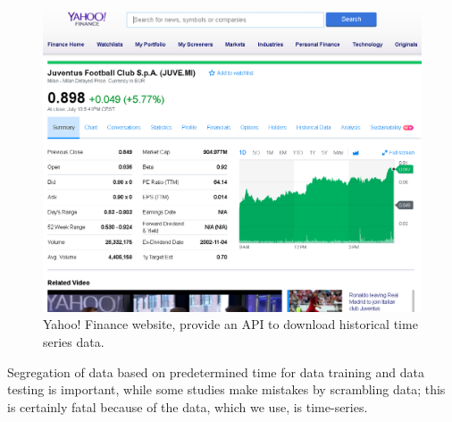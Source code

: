 \documentclass[10pt,twocolumn]{article}
\begin{document}
\begin{table}[]
\caption{The period time of our dataset, separated between the training, testing and independent data.}
\label{Tab:datasettime}
\end{table}

\begin{figure}
  \includegraphics[width=\linewidth]{figures/juvemarket.png}
  \caption{Yahoo! Finance website, provide an API to download historical time series data.}
  \label{fig:juvemarket}
\end{figure}
\par
Segregation of data based on predetermined time for data training and data testing is important, while some studies make mistakes by scrambling data; this is certainly fatal because of the data, which we use, is time-series.
\end{document}
